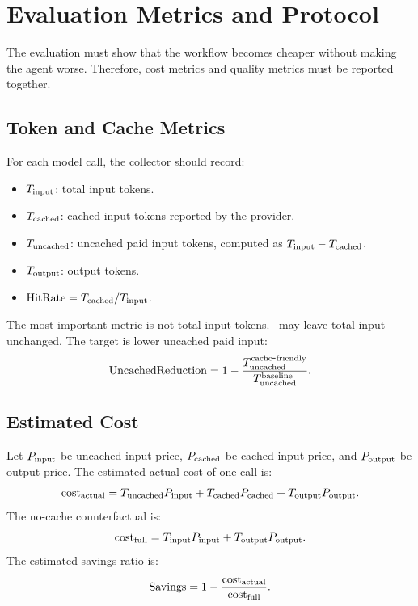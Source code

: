 \section{Evaluation Metrics and Protocol}
\label{sec:evaluation}

The evaluation must show that the workflow becomes cheaper without making the agent worse. Therefore, cost metrics and quality metrics must be reported together.

\subsection{Token and Cache Metrics}

For each model call, the collector should record:
\begin{itemize}[leftmargin=2em]
    \item $T_{\mathrm{input}}$: total input tokens.
    \item $T_{\mathrm{cached}}$: cached input tokens reported by the provider.
    \item $T_{\mathrm{uncached}}$: uncached paid input tokens, computed as $T_{\mathrm{input}} - T_{\mathrm{cached}}$.
    \item $T_{\mathrm{output}}$: output tokens.
    \item $\mathrm{HitRate} = T_{\mathrm{cached}} / T_{\mathrm{input}}$.
\end{itemize}

The most important metric is not total input tokens. \toolname\ may leave total input unchanged. The target is lower uncached paid input:
\begin{equation}
    \mathrm{UncachedReduction}
    =
    1 - \frac{T_{\mathrm{uncached}}^{\mathrm{cache\mbox{-}friendly}}}{T_{\mathrm{uncached}}^{\mathrm{baseline}}}.
\end{equation}

\subsection{Estimated Cost}

Let $P_{\mathrm{input}}$ be uncached input price, $P_{\mathrm{cached}}$ be cached input price, and $P_{\mathrm{output}}$ be output price. The estimated actual cost of one call is:
\begin{equation}
    \mathrm{cost}_{\mathrm{actual}}
    =
    T_{\mathrm{uncached}} P_{\mathrm{input}}
    + T_{\mathrm{cached}} P_{\mathrm{cached}}
    + T_{\mathrm{output}} P_{\mathrm{output}}.
\end{equation}
The no-cache counterfactual is:
\begin{equation}
    \mathrm{cost}_{\mathrm{full}}
    =
    T_{\mathrm{input}} P_{\mathrm{input}}
    + T_{\mathrm{output}} P_{\mathrm{output}}.
\end{equation}
The estimated savings ratio is:
\begin{equation}
    \mathrm{Savings}
    =
    1 - \frac{\mathrm{cost}_{\mathrm{actual}}}{\mathrm{cost}_{\mathrm{full}}}.
\end{equation}

